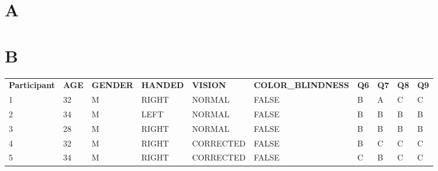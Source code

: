 \chapter{A}



\chapter{B}
\begin{table}[t]
    \centering
    \begin{tabular}{llllllllll}
    \textbf{Participant} & \textbf{AGE} & \textbf{GENDER} & \textbf{HANDED} & \textbf{VISION} & \textbf{COLOR\_BLINDNESS} & \textbf{Q6} & \textbf{Q7} & \textbf{Q8} & \textbf{Q9} \\
    1             & 32           & M               & RIGHT           & NORMAL          & FALSE                     & B           & A           & C           & C           \\
    2             & 34           & M               & LEFT            & NORMAL          & FALSE                     & B           & B           & B           & B           \\
    3             & 28           & M               & RIGHT           & NORMAL          & FALSE                     & B           & B           & B           & B           \\
    4             & 32           & M               & RIGHT           & CORRECTED       & FALSE                     & B           & C           & C           & C           \\
    5             & 34           & M               & RIGHT           & CORRECTED       & FALSE                     & C           & B           & C           & C          
    \end{tabular}
\end{table}